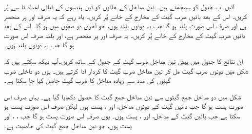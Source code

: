 آئیں اب جدول کو  سمجھتے ہیں۔ تین مداخل  کے خانوں کو تین ہندسوں کے ثنائی اعداد   تا  سے  پُر کریں۔ اس کے بعد بائیں ضرب گیٹ کے مخارج   کے خانے پُر کریں۔ یاد رہے   کہ یہ صرف  اور  پر منحصر ہے اور صرف اس صورت بلند ہو گا جب یہ دونوں بلند ہوں، جو آخری دو صفوں میں ہو گا۔ اس کے بعد دائیں ضرب گیٹ کے مخارج  کے خانے پُر کریں۔ یہ صرف  اور  پر منحصر ہے، اور بلند صرف اس صورت ہو گا جب یہ دونوں بلند ہوں۔

ان نتائج کا جدول  میں پیش تین مداخل ضرب گیٹ کے  جدول کے ساتھ کریں۔آپ دیکھ سکتے ہیں کہ شکل  میں دونوں ضرب گیٹ مل کر  تین مداخل  ضرب گیٹ کا کردار ادا کرتے ہیں۔ یوں دو داخلی ضرب گیٹوں کی مدد سے زیادہ مداخل کا ضرب گیٹ حاصل کیا جا سکتا ہے۔

 شکل    میں دو  مداخل جمع  گیٹوں  سے  تین  مداخل  جمع گیٹ کا حصول دکھایا گیا ہے۔  یہاں  صرف اس صورت پست ہو گا جب دائیں گیٹ  کے دونوں مداخل،  اور ،  پست ہوں لیکن  صرف اس صورت پست ہو سکتا ہے جب بائیں گیٹ کے  مداخل،  اور ، پست ہوں۔ یوں  صرف اس صورت پست ہو گا جب ، ، اور  پست ہوں، جو تین  مداخل جمع گیٹ کی  خاصیت ہے۔

